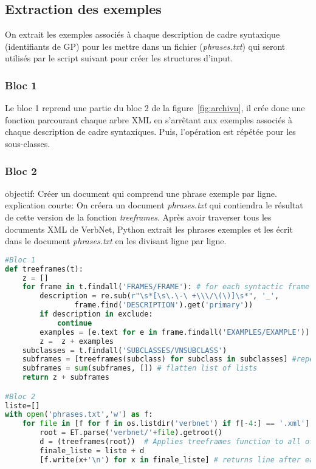 \subsection{Extraction des exemples}
On extrait les exemples associés à chaque description de cadre syntaxique (identifiants de \ac{GP}) pour les mettre dans un fichier (\emph{phrases.txt}) qui seront utilisés par le script suivant pour créer les structures d'input.

\subsubsection{Bloc 1}
Le bloc 1 reprend une partie du bloc 2 de la figure~\ref{fig:archivn}, il crée donc une fonction parcourant chaque arbre XML en s'arrêtant aux exemples associés à chaque description de cadre syntaxiques. Puis, l'opération est répétée pour les sous-classes.

\subsubsection{Bloc 2}
objectif: Créer un document qui comprend une phrase exemple par ligne.
explication courte: On créera un document \emph{phrases.txt} qui contiendra le résultat de cette version de la fonction \emph{treeframes}. Après avoir traverser tous les documents XML de VerbNet, Python extrait les phrases exemples et les écrit dans le document \emph{phrases.txt} en les divisant ligne par ligne. 

\begin{lstlisting}[language=Python, caption = Extraction des phrases exemples de VerbNet]
#Bloc 1
def treeframes(t):
    z = []
    for frame in t.findall('FRAMES/FRAME'): # for each syntactic frame
        description = re.sub(r"\s*[\s\.\-\ +\\\/\(\)]\s*", '_',
				frame.find('DESCRIPTION').get('primary'))
        if description in exclude:
            continue    
        examples = [e.text for e in frame.findall('EXAMPLES/EXAMPLE')] # get the examples
        z =  z + examples 
    subclasses = t.findall('SUBCLASSES/VNSUBCLASS')
    subframes = [treeframes(subclass) for subclass in subclasses] #repeat operation for subclasses
    subframes = sum(subframes, []) # flatten list of lists
    return z + subframes

#Bloc 2
liste=[]
with open('phrases.txt','w') as f:
    for file in [f for f in os.listdir('verbnet') if f[-4:] == '.xml']:
        root = ET.parse('verbnet/'+file).getroot()       
        d = (treeframes(root))  # Applies treeframes function to all of VerbNet files
        finale_liste = liste + d
        [f.write(x+'\n') for x in finale_liste] # returns line after each example

\end{lstlisting}

